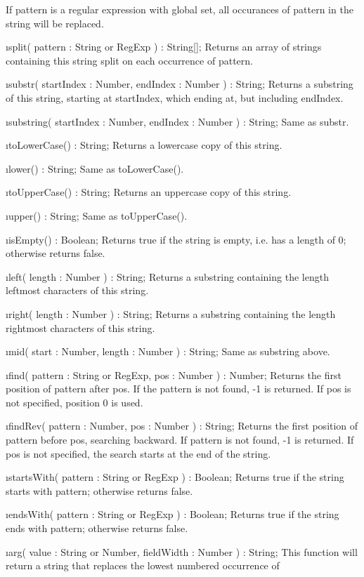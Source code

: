 \documentclass[11pt,a4paper]{book}
\renewcommand{\c}{\sf}
\begin{document}
{{{{{{If \c pattern is a regular expression with global set, all occurances
of \c pattern in the string will be replaced.

\i split( pattern : String or RegExp ) : String[]; Returns an array of
strings containing this string split on each occurrence of \c
pattern.

\i substr( startIndex : Number, endIndex : Number ) : String; Returns
a substring of this string, starting at \c startIndex, which ending
at, but including \c endIndex.

\i substring( startIndex : Number, endIndex : Number ) : String; Same as
substr.

\i toLowerCase() : String; Returns a lowercase copy of this string.

\i lower() : String; Same as toLowerCase().

\i toUpperCase() : String; Returns an uppercase copy of this string.

\i upper() : String; Same as toUpperCase().

\i isEmpty() : Boolean; Returns true if the string is empty, i.e. has
a length of 0; otherwise returns false.

\i left( length : Number ) : String; Returns a substring containing
the \c length leftmost characters of this string.

\i right( length : Number ) : String; Returns a substring containing
the \c length rightmost characters of this string.

\i mid( start : Number, length : Number ) : String; Same as substring above.

\i find( pattern : String or RegExp, pos : Number ) : Number; Returns
the first position of \c pattern after \c pos. If the pattern is not
found, -1 is returned.  If \c pos is not specified, position 0 is
used.

\i findRev( pattern : Number, pos : Number ) : String; Returns the
first position of \c pattern before \c pos, searching backward. If
pattern is not found, -1 is returned. If \c pos is not specified, the
search starts at the end of the string.

\i startsWith( pattern : String or RegExp ) : Boolean; Returns true if
the string starts with \c pattern; otherwise returns false.

\i endsWith( pattern : String or RegExp ) : Boolean; Returns true if
the string ends with \c pattern; otherwise returns false.

\i arg( value : String or Number, fieldWidth : Number ) : String; This
function will return a string that replaces the lowest numbered
occurrence of %

}}}}}}
\end{document}
